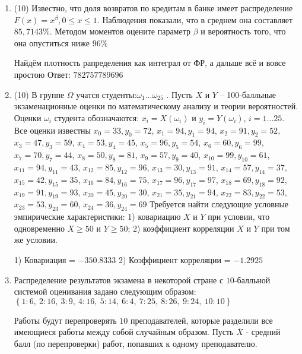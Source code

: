 \documentclass[a4paper,12pt]{article}
\begin{document}
\begin{enumerate}
\item


(10) Известно, что доля возвратов по кредитам в банке имеет распределение $F(x) = x ^{\beta}, 0 \leqslant x \leqslant 1$.
Наблюдения показали, что в среднем она составляет $85,7143\%$. Методом моментов оцените параметр $\beta$ и
вероятность того, что она опуститься ниже $96\%$




Найдём плотность рапределения как интеграл от ФР, а дальше всё и вовсе простою Ответ: $782757789696$


\item


(10) В группе $\Omega$ учатся студенты:$\omega _{1}...\omega _{25}$ . Пусть $X$ и $Y$ – 100-балльные экзаменационные оценки по
математическому анализу и теории вероятностей. Оценки $\omega _{i}$ студента обозначаются: $x _{i} = X(\omega _{i})$ и $y _{i} = Y(\omega _{i})$, $i = 1...25$. Все оценки известны
$x _{0} = 33, y _{0} = 72$, $x _{1} = 94, y _{1} = 94$, $x _{2} = 91, y _{2} = 52$, $x _{3} = 47, y _{3} = 59$, $x _{4} = 53, y _{4} = 45$, $x _{5} = 96, y _{5} = 54$, $x _{6} = 60, y _{6} = 99$, $x _{7} = 70, y _{7} = 44$, $x _{8} = 50, y _{8} = 81$, $x _{9} = 57, y _{9} = 40$, $x _{10} = 99, y _{10} = 61$, $x _{11} = 94, y _{11} = 43$, $x _{12} = 85, y _{12} = 96$, $x _{13} = 30, y _{13} = 91$, $x _{14} = 57, y _{14} = 37$, $x _{15} = 42, y _{15} = 35$, $x _{16} = 84, y _{16} = 75$, $x _{17} = 96, y _{17} = 97$, $x _{18} = 69, y _{18} = 92$, $x _{19} = 91, y _{19} = 93$, $x _{20} = 45, y _{20} = 30$, $x _{21} = 35, y _{21} = 94$, $x _{22} = 83, y _{22} = 53$, $x _{23} = 53, y _{23} = 60$, $x _{24} = 36, y _{24} = 69$
Требуется
найти следующие условные эмпирические характеристики: 1) ковариацию $X$ и $Y$ при условии, что одновременно $X \geqslant 50$
 и $Y \geqslant 50$; 2) коэффициент корреляции $X$ и $Y$ при том же условии.




1) Ковариация = $-350.8333$
2) Коэффициент корреляции = $-1.2925$


\item

    
    	Распределение результатов экзамена в некоторой стране с $10$-балльной системой оценивания задано следующим образом:
    	$\left\{ 1 : 6, \  2 : 16, \  3 : 9, \  4 : 16, \  5 : 14, \  6 : 4, \  7 : 25, \  8 : 26, \  9 : 24, \  10 : 10\right\}$

	Работы будут перепроверять $10$ преподавателей, которые разделили все имеющиеся работы между собой случайным образом. Пусть $\overline{X}$ - средний балл (по перепроверки) работ, попавших к одному преподавателю.


\end{enumerate}
\end{document}
